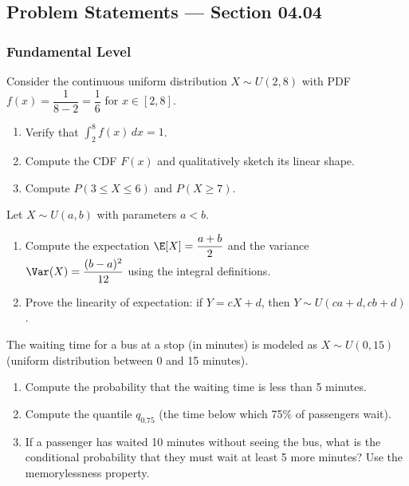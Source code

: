 
\subsection*{Problem Statements --- Section 04.04}

\subsubsection*{Fundamental Level}

\begin{problema}
	\label{prob:4.4.1}
	Consider the continuous uniform distribution $X \sim U(2, 8)$ with PDF $f(x) = \dfrac{1}{8-2} = \dfrac{1}{6}$ for $x \in [2, 8]$.
	\begin{enumerate}
		\item Verify that $\int_{2}^{8} f(x)\,dx = 1$.
		\item Compute the CDF $F(x)$ and qualitatively sketch its linear shape.
		\item Compute $P(3 \le X \le 6)$ and $P(X \ge 7)$.
	\end{enumerate}
\end{problema}

\begin{problema}
	\label{prob:4.4.2}
	Let $X \sim U(a, b)$ with parameters $a < b$.
	\begin{enumerate}
		\item Compute the expectation $\E[X] = \dfrac{a + b}{2}$ and the variance $\Var(X) = \dfrac{(b-a)^{2}}{12}$ using the integral definitions.
		\item Prove the linearity of expectation: if $Y = cX + d$, then $Y \sim U(ca + d, cb + d)$.
	\end{enumerate}
\end{problema}

\begin{problema}
	\label{prob:4.4.3}
	The waiting time for a bus at a stop (in minutes) is modeled as $X \sim U(0, 15)$ (uniform distribution between 0 and 15 minutes).
	\begin{enumerate}
		\item Compute the probability that the waiting time is less than 5 minutes.
		\item Compute the quantile $q_{0.75}$ (the time below which 75\% of passengers wait).
		\item If a passenger has waited 10 minutes without seeing the bus, what is the conditional probability that they must wait at least 5 more minutes? Use the memorylessness property.
	\end{enumerate}
\end{problema}


